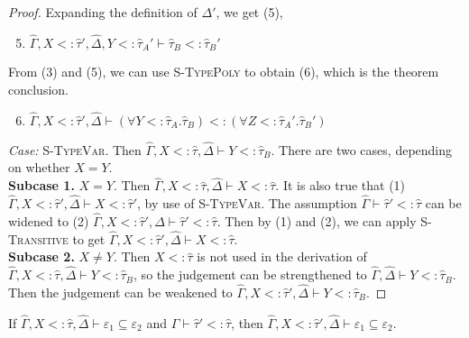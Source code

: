 \documentclass{llncs}
\begin{document}
\begin{proof}
Expanding the definition of $\Delta'$, we get (5),

\begin{enumerate}
	\setcounter{enumi}{4}
	\item $\hat \Gamma, X <: \hat \tau', \hat \Delta, Y <: \hat \tau_A' \vdash \hat \tau_B <: \hat \tau_B'$
\end{enumerate}

From (3) and (5), we can use \textsc{S-TypePoly} to obtain (6), which is the theorem conclusion.

\begin{enumerate}
	\setcounter{enumi}{5}
	\item $\hat \Gamma, X <: \hat \tau', \hat \Delta \vdash (\forall Y <: \hat \tau_A. \hat \tau_B) <: (\forall Z <: \hat \tau_A'. \hat \tau_B')$
\end{enumerate}


\textit{Case:} \textsc{S-TypeVar}. Then $\hat \Gamma, X <: \hat \tau, \hat \Delta \vdash Y <: \hat \tau_B$. There are two cases, depending on whether $X = Y$.\\

\textbf{Subcase 1.} $X = Y$. Then $\hat \Gamma, X <: \hat \tau, \hat \Delta \vdash X <: \hat \tau$. It is also true that (1) $\hat \Gamma, X <: \hat \tau', \hat \Delta \vdash X <: \hat \tau'$, by use of \textsc{S-TypeVar}. The assumption $\hat \Gamma \vdash \hat \tau' <: \hat \tau$ can be widened to (2) $\hat \Gamma, X <: \hat \tau', \hat \Delta \vdash \hat \tau' <: \hat \tau$. Then by (1) and (2), we can apply \textsc{S-Transitive} to get $\hat \Gamma, X <: \hat \tau', \hat \Delta \vdash X <: \hat \tau$. \\

\textbf{Subcase 2.} $X \neq Y$. Then $X <: \hat \tau$ is not used in the derivation of $\hat \Gamma, X <: \hat \tau, \hat \Delta \vdash Y <: \hat \tau_B$, so the judgement can be strengthened to $\hat \Gamma, \hat \Delta \vdash Y <: \hat \tau_B$. Then the judgement can be weakened to $\hat \Gamma, X <: \hat \tau', \hat \Delta \vdash Y <: \hat \tau_B$.


\end{proof}

\hrulefill

\begin{lemma}
If $\hat \Gamma, X <: \hat \tau, \hat \Delta \vdash \varepsilon_1 \subseteq \varepsilon_2$ and $\hat \Gamma \vdash \hat \tau' <: \hat \tau$, then $\hat \Gamma, X <: \hat \tau', \hat \Delta \vdash \varepsilon_1 \subseteq \varepsilon_2$.
\end{lemma}
\end{document}

